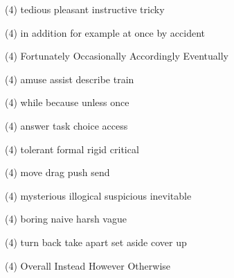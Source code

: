 \item
\begin{tasks}(4)
	\task tedious
	\task pleasant
	\task instructive
	\task tricky
\end{tasks}
\item
\begin{tasks}(4)
	\task in addition
	\task for example
	\task at once
	\task by accident
\end{tasks}
\item
\begin{tasks}(4)
	\task Fortunately
	\task Occasionally
	\task Accordingly
	\task Eventually
\end{tasks}
\item
\begin{tasks}(4)
	\task amuse
	\task assist
	\task describe
	\task train
\end{tasks}
\item
\begin{tasks}(4)
	\task while
	\task because
	\task unless
	\task once
\end{tasks}
\item
\begin{tasks}(4)
	\task answer
	\task task
	\task choice
	\task access
\end{tasks}
\item
\begin{tasks}(4)
	\task tolerant
	\task formal
	\task rigid
	\task critical
\end{tasks}
\item
\begin{tasks}(4)
	\task move
	\task drag
	\task push
	\task send
\end{tasks}
\item
\begin{tasks}(4)
	\task mysterious
	\task illogical
	\task suspicious
	\task inevitable
\end{tasks}
\item
\begin{tasks}(4)
	\task boring
	\task naive
	\task harsh
	\task vague
\end{tasks}
\item
\begin{tasks}(4)
	\task turn back
	\task take apart
	\task set aside
	\task cover up
\end{tasks}
\item
\begin{tasks}(4)
	\task Overall
	\task Instead
	\task However
	\task Otherwise
\end{tasks}
\item
